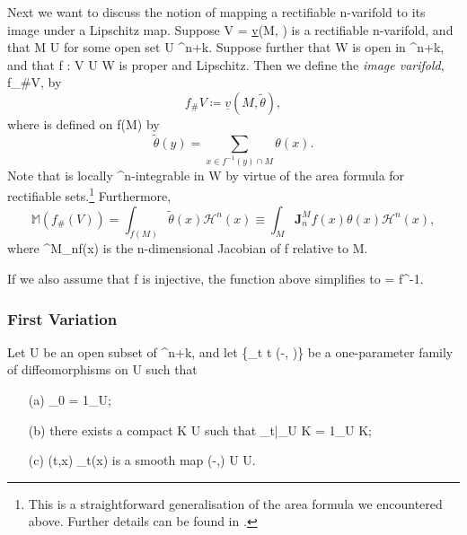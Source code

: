 \documentclass[a4paper, 11pt]{article}
\theoremstyle{plain}
\theoremstyle{definition}
\theoremstyle{remark}
\numberwithin{equation}{subsection}
\def\({}
\def\){}
\begin{document}


Next we want to discuss the notion of mapping a rectifiable \(n\)-varifold to its image under a Lipschitz map. Suppose \(V = \underline{v}(M, \theta)\) is a rectifiable \(n\)-varifold, and that \(M \subset U\) for some open set \(U \subset {}^{n+k}\). Suppose further that \(W\) is open in \(^{n+k}\), and that \(f :  V \cap U \rightarrow W\) is proper and Lipschitz. Then we define the \emph{image varifold}, \(f_{\#}V\), by
\begin{equation}
f_{\#}V \coloneq \underline{v}(M, \tilde{\theta}),
\end{equation}
where \(\tilde{\theta}\) is defined on \(f(M)\) by
\begin{equation}
\tilde{\theta}(y) = \sum_{x \in f^{-1}(y) \cap M}\theta(x).
\end{equation}
Note that \(\tilde{\theta}\) is locally \(^{n}\)-integrable in \(W\) by virtue of the area formula for rectifiable sets.\footnote{This is a straightforward generalisation of the area formula we encountered above. Further details can be found in \cite[Section 3.3]{Rin22}.} Furthermore,
\begin{equation}
\mathbb{M}(f_{\#}(V)) = \int_{f(M)}\tilde{\theta}(x)\mathcal{H}^{n}(x) \equiv \int_{M} \mathbf{J}^{M}_{n}f(x)\theta(x)\mathcal{H}^{n}(x),
\end{equation}
where \(^{M}_{n}f(x)\) is the \(n\)-dimensional Jacobian of \(f\) relative to \(M\).

If we also assume that \(f\) is injective, the function \(\tilde{\theta}\) above simplifies to \(\tilde{\theta} = \theta \circ f^{-1}\).



\subsubsection{First Variation}

Let \(U\) be an open subset of \(^{n+k}\), and let \(\{\varphi_{t} \vcentcolon t \in (-\varepsilon, \varepsilon)\}\) be a one-parameter family of diffeomorphisms on \(U\) such that
\begin{itemize}
\item[(a)] \(\varphi_{0} = 1_{U}\);
\item[(b)] there exists a compact \(K \subset U\) such that \(\varphi_{t}|_{U \setminus K} = 1_{U \setminus K}\);
\item[(c)] \((t,x) \longmapsto \varphi_{t}(x)\) is a smooth map \((-\varepsilon,\varepsilon) \times U \longrightarrow U\).
\end{itemize}
\end{document}
